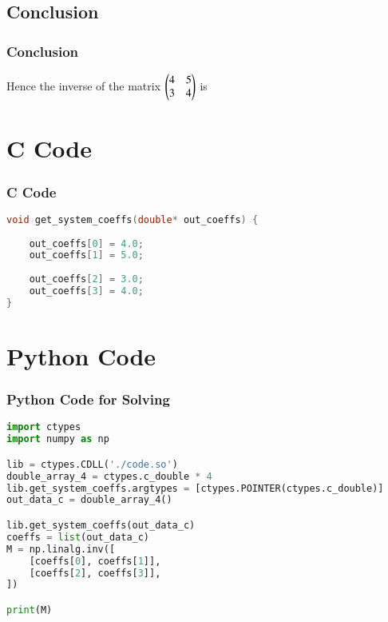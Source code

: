 \documentclass{beamer}
\numberwithin{equation}{section}
\begin{document}
\subsection{Conclusion}
\begin{frame}
\frametitle{Conclusion}
 Hence the inverse of the matrix $\begin{pmatrix}4&5\\3&4\end{pmatrix}$ is 
\end{frame}
\section{C Code}
\begin{frame}[fragile]
\frametitle{C Code}
\begin{lstlisting}[language=C]
void get_system_coeffs(double* out_coeffs) {
     
    out_coeffs[0] = 4.0;
    out_coeffs[1] = 5.0;
   
    out_coeffs[2] = 3.0;
    out_coeffs[3] = 4.0;
}
    \end{lstlisting}
\end{frame}
\section{Python Code}
\begin{frame}[fragile]
\frametitle{Python Code for Solving}
\begin{lstlisting}[language=Python]
import ctypes
import numpy as np

lib = ctypes.CDLL('./code.so')
double_array_4 = ctypes.c_double * 4
lib.get_system_coeffs.argtypes = [ctypes.POINTER(ctypes.c_double)]
out_data_c = double_array_4()

lib.get_system_coeffs(out_data_c)
coeffs = list(out_data_c)
M = np.linalg.inv([
    [coeffs[0], coeffs[1]],
    [coeffs[2], coeffs[3]],
])

print(M)
\end{lstlisting}
\end{frame}
\end{document}
